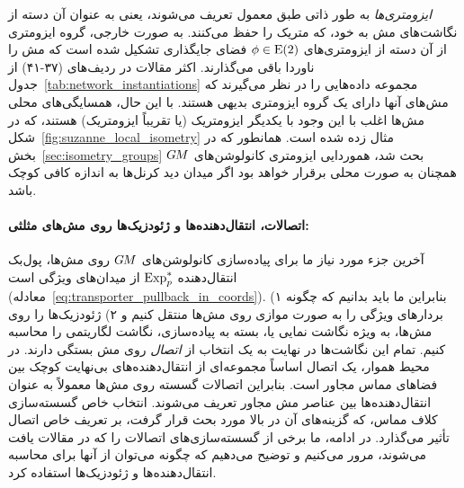\emph{ایزومتری‌ها} به طور ذاتی طبق معمول تعریف می‌شوند، یعنی به عنوان آن دسته از نگاشت‌های مش به خود، که متریک را حفظ می‌کنند.
به صورت خارجی، گروه ایزومتری از آن دسته از ایزومتری‌های $\phi \in \operatorname{E}(2)$ فضای جایگذاری تشکیل شده است که مش را ناوردا باقی می‌گذارند.
اکثر مقالات در
ردیف‌های (۳۷-۴۱)
از جدول~\ref{tab:network_instantiations}
مجموعه داده‌هایی را در نظر می‌گیرند که مش‌های آنها دارای یک گروه ایزومتری بدیهی هستند.
با این حال، همسایگی‌های محلی مش‌ها اغلب با این وجود با یکدیگر ایزومتریک (یا تقریباً ایزومتریک) هستند، که در شکل~\ref{fig:suzanne_local_isometry} مثال زده شده است.
همانطور که در بخش~\ref{sec:isometry_groups} بحث شد، هموردایی ایزومتری کانولوشن‌های $G\mkern-1.4muM$ همچنان به صورت محلی برقرار خواهد بود اگر میدان دید کرنل‌ها به اندازه کافی کوچک باشد.







\paragraph{اتصالات، انتقال‌دهنده‌ها و ژئودزیک‌ها روی مش‌های مثلثی:}
آخرین جزء مورد نیاز ما برای پیاده‌سازی کانولوشن‌های $G\mkern-1.4muM$ روی مش‌ها، پول‌بک انتقال‌دهنده $\operatorname{Exp}^*_p$ از میدان‌های ویژگی است (معادله~\eqref{eq:transporter_pullback_in_coords}).
بنابراین ما باید بدانیم که چگونه
۱) بردارهای ویژگی را به صورت موازی روی مش‌ها منتقل کنیم و
۲) ژئودزیک‌ها را روی مش‌ها، به ویژه نگاشت نمایی یا، بسته به پیاده‌سازی، نگاشت لگاریتمی را محاسبه کنیم.
تمام این نگاشت‌ها در نهایت به یک انتخاب از \emph{اتصال} روی مش بستگی دارند.
در محیط هموار، یک اتصال اساساً مجموعه‌ای از انتقال‌دهنده‌های بی‌نهایت کوچک بین فضاهای مماس مجاور است.
بنابراین اتصالات گسسته روی مش‌ها معمولاً به عنوان انتقال‌دهنده‌ها بین عناصر مش مجاور تعریف می‌شوند.
انتخاب خاص گسسته‌سازی کلاف مماس، که گزینه‌های آن در بالا مورد بحث قرار گرفت، بر تعریف خاص اتصال تأثیر می‌گذارد.
در ادامه، ما برخی از گسسته‌سازی‌های اتصالات را که در مقالات یافت می‌شوند، مرور می‌کنیم و توضیح می‌دهیم که چگونه می‌توان از آنها برای محاسبه انتقال‌دهنده‌ها و ژئودزیک‌ها استفاده کرد.


